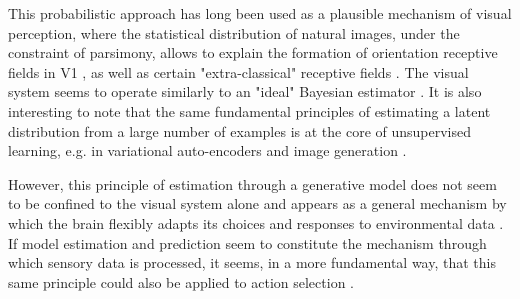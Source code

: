 \documentclass[10pt,letterpaper]{article}
\begin{document}
This probabilistic approach has long been used as a plausible mechanism of visual perception, where the statistical distribution of natural images, under the constraint of parsimony, allows to explain the formation of orientation receptive fields in V1 \cite{simoncelli2001natural}, as well as certain "extra-classical" receptive fields \cite{rao1999predictive}. The visual system seems to operate similarly to an "ideal" Bayesian estimator \cite{geisler1989sequential,geisler2008visual}. It is also interesting to note that the same fundamental principles of estimating a latent distribution from a large number of examples is at the core of unsupervised learning, e.g. in variational auto-encoders and image generation \cite{hinton1995wake, kingma2013auto, rombach2022high}.



However, this principle of estimation through a generative model does not seem to be confined to the visual system alone and appears as a general mechanism by which the brain flexibly adapts its choices and responses to environmental data . If model estimation and prediction seem to constitute the mechanism through which sensory data is processed, it seems, in a more fundamental way, that this same principle could also be applied to action selection \cite{friston2010free}. 
\end{document}
